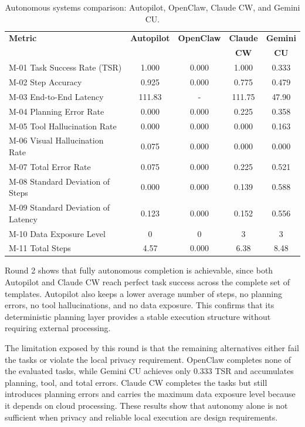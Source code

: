 \begin{table}[H]
\centering
\begin{tabularx}{\textwidth}{|X|c|c|c|c|}
\hline
\textbf{Metric} & \textbf{Autopilot} & \textbf{OpenClaw} & \textbf{Claude} & \textbf{Gemini} \\
 & & & \textbf{CW} & \textbf{CU} \\
\hline
M-01 Task Success Rate (TSR)        & 1.000  & 0.000 & 1.000 & 0.333 \\
\hline
M-02 Step Accuracy                  & 0.925  & 0.000 & 0.775 & 0.479 \\
\hline
M-03 End-to-End Latency             & 111.83 & - & 111.75 & 47.90 \\
\hline
M-04 Planning Error Rate            & 0.000  & 0.000 & 0.225 & 0.358 \\
\hline
M-05 Tool Hallucination Rate        & 0.000  & 0.000 & 0.000 & 0.163 \\
\hline
M-06 Visual Hallucination Rate      & 0.075  & 0.000 & 0.000 & 0.000 \\
\hline
M-07 Total Error Rate               & 0.075  & 0.000 & 0.225 & 0.521 \\
\hline
M-08 Standard Deviation of Steps    & 0.000  & 0.000 & 0.139 & 0.588 \\
\hline
M-09 Standard Deviation of Latency  & 0.123  & 0.000 & 0.152 & 0.556 \\
\hline
M-10 Data Exposure Level            & 0      & 0     & 3     & 3     \\
\hline
M-11 Total Steps                    & 4.57   & 0.000 & 6.38  & 8.48  \\
\hline
\end{tabularx}
\caption{Autonomous systems comparison: Autopilot, OpenClaw, Claude CW, and Gemini CU.}
\label{tab:autonomous_comparative}
\end{table}

Round 2 shows that fully autonomous completion is achievable, since both Autopilot and Claude CW reach perfect task success across the complete set of templates. Autopilot also keeps a lower average number of steps, no planning errors, no tool hallucinations, and no data exposure. This confirms that its deterministic planning layer provides a stable execution structure without requiring external processing.

The limitation exposed by this round is that the remaining alternatives either fail the tasks or violate the local privacy requirement. OpenClaw completes none of the evaluated tasks, while Gemini CU achieves only 0.333 TSR and accumulates planning, tool, and total errors. Claude CW completes the tasks but still introduces planning errors and carries the maximum data exposure level because it depends on cloud processing. These results show that autonomy alone is not sufficient when privacy and reliable local execution are design requirements.

